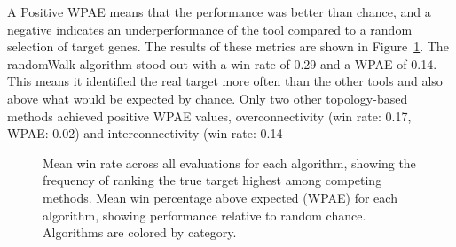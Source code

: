 A Positive WPAE means that the performance was better than chance, and a negative indicates an underperformance of the tool compared to a random selection of target genes. The results of these metrics are shown in Figure~\ref{fig:fig4.3.Win_and_WPAE}. The randomWalk algorithm stood out with a win rate of 0.29 and a WPAE of 0.14. This means it identified the real target more often than the other tools and also above what would be expected by chance. Only two other topology-based methods achieved positive WPAE values, overconnectivity (win rate: 0.17, WPAE: 0.02) and interconnectivity (win rate: 0.14%


\begin{figure}[htbp]
  \centering
  \caption[Mean win rate across all evaluations for each algorithm.]{Mean win rate across all evaluations for each algorithm, showing the frequency of ranking the true target highest among competing methods. Mean win percentage above expected (WPAE) for each algorithm, showing performance relative to random chance. Algorithms are colored by category.}
  \label{fig:fig4.3.Win_and_WPAE}
\end{figure}

